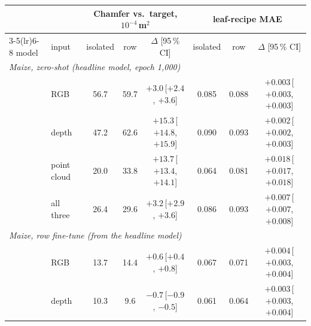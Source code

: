 \begin{table}[t]
  \centering\scriptsize
  \setlength{\tabcolsep}{3.0pt}
  \begin{tabular}{l l ccc ccc}
    \toprule
    & & \multicolumn{3}{c}{Chamfer vs.\ target, $10^{-4}\,$m$^2$} & \multicolumn{3}{c}{leaf-recipe MAE} \\
    \cmidrule(lr){3-5}\cmidrule(lr){6-8}
    model & input & isolated & row & $\Delta$ [95\,\% CI] & isolated & row & $\Delta$ [95\,\% CI] \\
    \midrule
    \multicolumn{8}{l}{\emph{Maize, zero-shot (headline model, epoch 1{,}000)}} \\
    & RGB         & 56.7 & 59.7 & $+3.0$\,{\tiny[$+2.4$, $+3.6$]} & 0.085 & 0.088 & $+0.003$\,{\tiny[$+0.003$, $+0.003$]} \\
    & depth       & 47.2 & 62.6 & $+15.3$\,{\tiny[$+14.8$, $+15.9$]} & 0.090 & 0.093 & $+0.002$\,{\tiny[$+0.002$, $+0.003$]} \\
    & point cloud & 20.0 & 33.8 & $+13.7$\,{\tiny[$+13.4$, $+14.1$]} & 0.064 & 0.081 & $+0.018$\,{\tiny[$+0.017$, $+0.018$]} \\
    & all three   & 26.4 & 29.6 & $+3.2$\,{\tiny[$+2.9$, $+3.6$]} & 0.086 & 0.093 & $+0.007$\,{\tiny[$+0.007$, $+0.008$]} \\
    \midrule
    \multicolumn{8}{l}{\emph{Maize, row fine-tune (from the headline model)}} \\
    & RGB         & 13.7 & 14.4 & $+0.6$\,{\tiny[$+0.4$, $+0.8$]} & 0.067 & 0.071 & $+0.004$\,{\tiny[$+0.003$, $+0.004$]} \\
    & depth       & 10.3 & 9.6 & $-0.7$\,{\tiny[$-0.9$, $-0.5$]} & 0.061 & 0.064 & $+0.003$\,{\tiny[$+0.003$, $+0.004$]} \\

\end{tabular}
\end{table}
